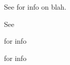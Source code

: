 \documentclass{dune}
\begin{document}
%





See \tcches for info on blah. 

See \tcchproj 

\tcchjpo for info

\tcchdesorg for info

\tcchie

\introchtc


\physchndk

\spchtpcelec

\dpchcalib

\tcchrev

\cleardoublepage



\end{document}
